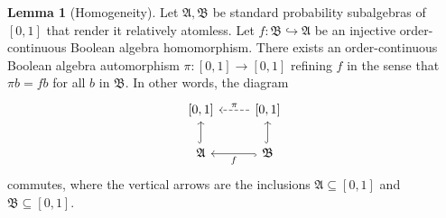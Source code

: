 \documentclass[
  sigconf,
  screen, ]{acmart}
\theoremstyle{definition}
\newtheorem{lemma}[theorem]{Lemma}
\newcommand\frakA{\mathfrak A}
\newcommand\frakB{\mathfrak B}
\begin{document}
\begin{lemma}[Homogeneity] \label{app:lem:mble-homogeneity}
  Let $\frakA,\frakB$ be standard probability subalgebras of $[0,1]$ that render it relatively atomless.
  Let $f : \frakB\hookrightarrow \frakA$
  be an injective order-continuous Boolean algebra homomorphism.
  There exists an order-continuous Boolean algebra automorphism $\pi : [0,1]\to[0,1]$
  refining $f$ in the sense that $\pi b = f b$ for all $b$ in $\frakB$.
  In other words, the diagram
\[ \begin{tikzcd}
    {[0,1]}                        & {[0,1]} \arrow[l, "\pi"', dashed]                     \\
    {\frakA} \arrow[u, hook] & {\frakB} \arrow[l, "f", hook] \arrow[u, hook]
    \end{tikzcd}\]
   commutes, where the vertical arrows are the inclusions $\frakA\subseteq[0,1]$ and $\frakB\subseteq[0,1]$.
\end{lemma}
\end{document}
